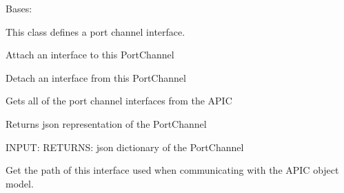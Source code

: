 \documentclass[letterpaper,10pt,english]{sphinxmanual}
\begin{document}
\begin{fulllineitems}
\label{acitoolkit:acitoolkit.PortChannel}
Bases: {\hyperref[acitoolkit:acitoolkit.BaseInterface]{}}

This class defines a port channel interface.

\begin{fulllineitems}
\label{acitoolkit:acitoolkit.PortChannel.attach}
Attach an interface to this PortChannel

\end{fulllineitems}


\begin{fulllineitems}
\label{acitoolkit:acitoolkit.PortChannel.detach}
Detach an interface from this PortChannel

\end{fulllineitems}


\begin{fulllineitems}
\label{acitoolkit:acitoolkit.PortChannel.get}
Gets all of the port channel interfaces from the APIC

\end{fulllineitems}


\begin{fulllineitems}
\label{acitoolkit:acitoolkit.PortChannel.get_json}
Returns json representation of the PortChannel

INPUT:
RETURNS: json dictionary of the PortChannel

\end{fulllineitems}


\begin{fulllineitems}
\label{acitoolkit:acitoolkit.PortChannel.get_path}
Get the path of this interface used when communicating with
the APIC object model.


\end{fulllineitems}
\end{fulllineitems}
\end{document}
